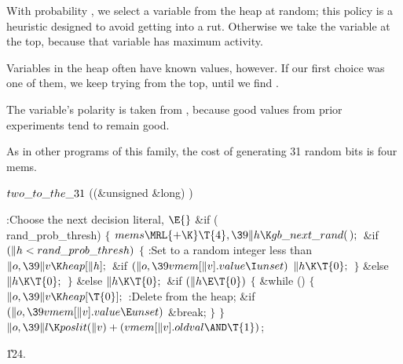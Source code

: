 With probability , we select a variable
from the heap at random;
this policy is a heuristic designed to avoid getting into a rut.
Otherwise we take the variable at the top, because that variable has
maximum activity.

Variables in the heap often have known values, however. If our
first choice was one of them, we keep trying from the top,
until we find .

The variable's polarity is taken from , because
good values from prior experiments tend to remain good.

As in other programs of this family, the cost of generating
31 random bits is four mems.

\Y\B\4\D$\\{two\_to\_the\_31}$ \5
((\&{unsigned} \&{long}) )\par
\Y\B\4:Choose the next decision literal, \X${}\E{}$\6
\&{if} (\\{rand\_prob\_thresh})\5
${}\{{}$\1\6
${}\\{mems}\MRL{+{\K}}\T{4},\39\|h\K\\{gb\_next\_rand}(\,);{}$\6
\&{if} ${}(\|h<\\{rand\_prob\_thresh}){}$\5
${}\{{}$\1\6
:Set  to a random integer less than \X\6
${}\|o,\39\|v\K\\{heap}[\|h];{}$\6
\&{if} ${}(\|o,\39\\{vmem}[\|v].\\{value}\I\\{unset}){}$\1\5
${}\|h\K\T{0};{}$\2\6
\4${}\}{}$\5
\2\&{else}\1\5
${}\|h\K\T{0};{}$\2\6
\4${}\}{}$\5
\2\&{else}\1\5
${}\|h\K\T{0};{}$\2\6
\&{if} ${}(\|h\E\T{0}){}$\5
${}\{{}$\1\6
\&{while} ()\5
${}\{{}$\1\6
${}\|o,\39\|v\K\\{heap}[\T{0}];{}$\6
:Delete  from the heap\X;\6
\&{if} ${}(\|o,\39\\{vmem}[\|v].\\{value}\E\\{unset}){}$\1\5
\&{break};\2\6
\4${}\}{}$\2\6
\4${}\}{}$\2\6
${}\|o,\39\|l\K\\{poslit}(\|v)+(\\{vmem}[\|v].\\{oldval}\AND\T{1}){}$;\par
\U124.\fi

